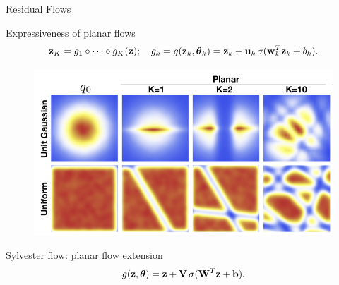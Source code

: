 \begin{frame}{Residual Flows}
	\begin{block}{Expressiveness of planar flows}
		\vspace{-0.5cm}
		\[
			\mathbf{z}_K = g_1 \circ \dots \circ g_K (\mathbf{z}); \quad g_k = g(\mathbf{z}_k, \boldsymbol{\theta}_k) = \mathbf{z}_k + \mathbf{u}_k\, \sigma(\mathbf{w}_k^T\mathbf{z}_k + b_k).
		\]
		\vspace{-0.8cm}
		\begin{figure}
			\centering
			\includegraphics[width=0.7\linewidth]{figs/planar_flows.png}
		\end{figure}
		\vspace{-0.5cm}
	\end{block}
	\begin{block}{Sylvester flow: planar flow extension}
		\vspace{-0.3cm}
		\[
		g(\mathbf{z}, \boldsymbol{\theta}) = \mathbf{z} + \mathbf{V} \, \sigma(\mathbf{W}^T\mathbf{z} + \mathbf{b}).
		\]
	\end{block}
\end{frame}

